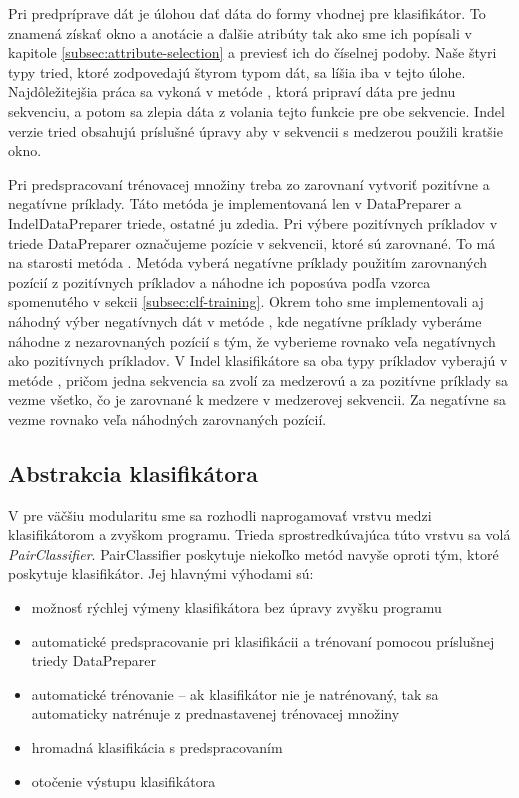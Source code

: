 Pri predpríprave dát je úlohou dať dáta do formy vhodnej pre klasifikátor. To znamená získať okno a anotácie a ďalšie atribúty tak ako sme ich popísali v kapitole \ref{subsec:attribute-selection} a previesť ich do číselnej podoby. Naše štyri typy tried, ktoré zodpovedajú štyrom typom dát, sa líšia iba v tejto úlohe. Najdôležitejšia práca sa vykoná v metóde , ktorá pripraví dáta pre jednu sekvenciu, a potom sa zlepia dáta z volania tejto funkcie pre obe sekvencie. Indel verzie tried obsahujú príslušné úpravy aby v sekvencii s medzerou použili kratšie okno.

Pri predspracovaní trénovacej množiny treba zo zarovnaní vytvoriť pozitívne a negatívne príklady. Táto metóda je implementovaná len v DataPreparer a IndelDataPreparer triede, ostatné ju zdedia. Pri výbere pozitívnych príkladov v triede DataPreparer označujeme pozície v sekvencii, ktoré sú zarovnané. To má na starosti metóda . Metóda  vyberá negatívne príklady použitím zarovnaných pozícií z pozitívnych príkladov a náhodne ich poposúva podľa vzorca spomenutého v sekcii \ref{subsec:clf-training}. Okrem toho sme implementovali aj náhodný výber negatívnych dát v metóde , kde negatívne príklady vyberáme náhodne z nezarovnaných pozícií s tým, že vyberieme rovnako veľa negatívnych ako pozitívnych príkladov. V Indel klasifikátore sa oba typy príkladov vyberajú v metóde , pričom jedna sekvencia sa zvolí za medzerovú a za pozitívne príklady sa vezme všetko, čo je zarovnané k medzere v medzerovej sekvencii. Za negatívne sa vezme rovnako veľa náhodných zarovnaných pozícií.

\subsection{Abstrakcia klasifikátora}
\label{subsec:pairclassifier}
V pre väčšiu modularitu sme sa rozhodli naprogamovať vrstvu medzi klasifikátorom a zvyškom programu. Trieda sprostredkúvajúca túto vrstvu sa volá \textit{PairClassifier}. PairClassifier poskytuje niekoľko metód navyše oproti tým, ktoré poskytuje klasifikátor.
Jej hlavnými výhodami sú:

\begin{itemize}
    \item možnosť rýchlej výmeny klasifikátora bez úpravy zvyšku programu
    \item automatické predspracovanie pri klasifikácii a trénovaní pomocou príslušnej triedy DataPreparer
    \item automatické trénovanie -- ak klasifikátor nie je natrénovaný, tak sa automaticky natrénuje z prednastavenej trénovacej množiny
    \item hromadná klasifikácia s predspracovaním
    \item otočenie výstupu klasifikátora
\end{itemize}

